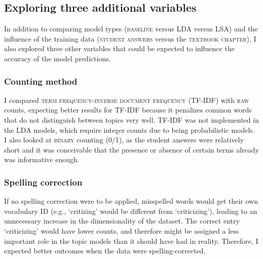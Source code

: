 \documentclass[a4paper,10pt,twoside]{article}
\begin{document}
\subsection{Exploring three additional variables}
\label{sec:exploring}
In addition to comparing model types (\textsc{baseline} versus LDA versus LSA) and the influence of the training data (\textsc{student answers} versus the \textsc{textbook chapter}), I also explored three other variables that could be expected to influence the accuracy of the model predictions.

\subsubsection{Counting method}
\label{sec:countingmethod}
I compared \textsc{term frequency-inverse document frequency} (TF-IDF) with \textsc{raw} counts, expecting better results for TF-IDF because it penalizes common words that do not distinguish between topics very well. TF-IDF was not implemented in the LDA models, which require integer counts due to being probabilistic models. I also looked at \textsc{binary} counting (0/1), as the student answers were relatively short and it was conceivable that the presence or absence of certain terms already was informative enough.

\subsubsection{Spelling correction}
\label{sec:spelling}
If no spelling correction were to be applied, misspelled words would get their own vocabulary ID (e.g., `critizing' would be different from `criticizing'), leading to an unnecessary increase in the dimensionality of the dataset. The correct entry `criticizing' would have lower counts, and therefore might be assigned a less important role in the topic models than it should have had in reality. Therefore, I expected better outcomes when the data were spelling-corrected.

\end{document}

